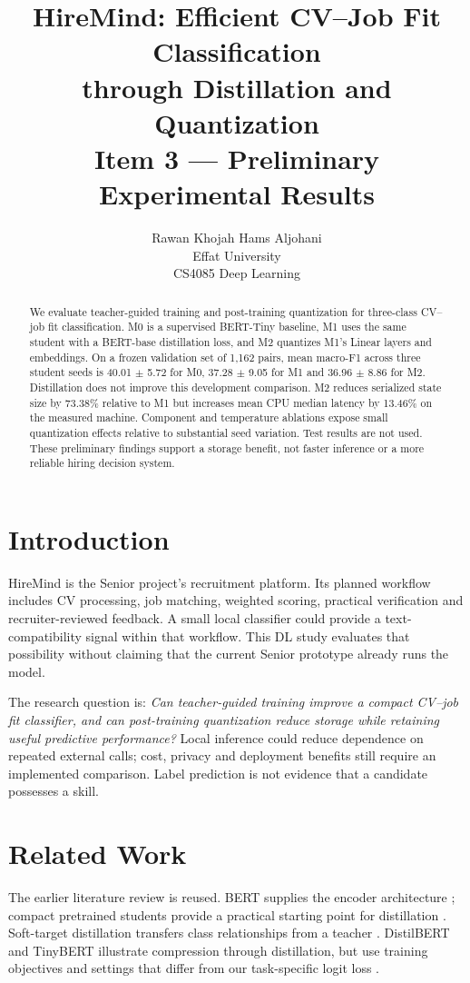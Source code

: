 \documentclass[11pt]{article}
\title{HireMind: Efficient CV--Job Fit Classification\\through Distillation and Quantization\\[4pt]\large Item 3 --- Preliminary Experimental Results}
\author{Rawan Khojah \quad Hams Aljohani\\Effat University\\CS4085 Deep Learning}
\begin{document}
\maketitle
\pagestyle{plain}
\begin{abstract}
We evaluate teacher-guided training and post-training quantization for three-class CV--job fit classification. M0 is a supervised BERT-Tiny baseline, M1 uses the same student with a BERT-base distillation loss, and M2 quantizes M1's Linear layers and embeddings. On a frozen validation set of 1,162 pairs, mean macro-F1 across three student seeds is 40.01 $\pm$ 5.72 for M0, 37.28 $\pm$ 9.05 for M1 and 36.96 $\pm$ 8.86 for M2. Distillation does not improve this development comparison. M2 reduces serialized state size by 73.38\% relative to M1 but increases mean CPU median latency by 13.46\% on the measured machine. Component and temperature ablations expose small quantization effects relative to substantial seed variation. Test results are not used. These preliminary findings support a storage benefit, not faster inference or a more reliable hiring decision system.
\end{abstract}


\section{Introduction}
HireMind is the Senior project's recruitment platform. Its planned workflow includes CV processing, job matching, weighted scoring, practical verification and recruiter-reviewed feedback. A small local classifier could provide a text-compatibility signal within that workflow. This DL study evaluates that possibility without claiming that the current Senior prototype already runs the model.

The research question is: \emph{Can teacher-guided training improve a compact CV--job fit classifier, and can post-training quantization reduce storage while retaining useful predictive performance?} Local inference could reduce dependence on repeated external calls; cost, privacy and deployment benefits still require an implemented comparison. Label prediction is not evidence that a candidate possesses a skill.

\section{Related Work}
The earlier literature review is reused. BERT supplies the encoder architecture \citep{bert}; compact pretrained students provide a practical starting point for distillation \citep{turc}. Soft-target distillation transfers class relationships from a teacher \citep{hinton}. DistilBERT and TinyBERT illustrate compression through distillation, but use training objectives and settings that differ from our task-specific logit loss \citep{distilbert,tinybert}.
\end{document}
